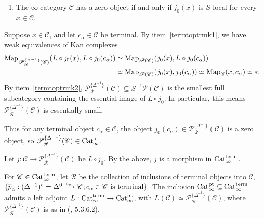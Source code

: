\documentclass{tac}
\newcommand{\s}[1]{\mathscr{#1}}
\newcommand{\maybehat}[1]{#1} %
\newcommand{\ol}[1]{\overline{#1}}
\newcommand{\tx}[1]{\textnormal{#1}}
\begin{document}
\begin{rmk}
\begin{enumerate}
\item\label{termtoptrmk3} The $\infty$-category $\s{C}$ has a zero object if and only if $j_0 (x)$ is $S$-local for every $x\in\s{C} $.
\end{enumerate}
Suppose $x\in\s{C}$, and let $c_\alpha \in \s{C}$ be terminal.  By item~\ref{termtoptrmk1}, we have weak equivalences of Kan complexes
\begin{align*} \tx{Map}_{\s{P}^{\{ \Delta^{-1} \}}_{\s{R}}(\s{C}) } (L\circ j_0 (x), L\circ j_0 (c_\alpha)) & \simeq  \tx{Map}_{\s{P}(\s{C}) } ( j_0 (x), L\circ j_0 (c_\alpha)) \\ 
& \simeq  \tx{Map}_{\s{P}(\s{C}) } ( j_0 (x),  j_0 (c_\alpha)) \simeq \tx{Map}_{\s{C}}(x,c_\alpha) \simeq *.
\end{align*}
By item~\ref{termtoptrmk2}, $\s{P}^{\{ \Delta^{-1} \}}_{\s{R}}(\s{C}) \subseteq S^{-1} \s{P}(\s{C})$ is the smallest full subcategory containing the essential image of $L\circ j_0$.  In particular, this means $\s{P}^{\{ \Delta^{-1} \}}_{\s{R}}(\s{C})$ is essentially small.

Thus for any terminal object $c_\alpha \in \s{C}$, the object $j_0 (c_\alpha) \in \s{P}^{\{ \Delta^{-1} \}}_{\s{R}}(\s{C}) $ is a zero object, so $\s{P}^{\{ \Delta^{-1} \}}_{\s{R}}(\s{C}) \in \maybehat{\tx{Cat}}_\infty^\tx{pt}$.

Let $j : \s{C} \to \s{P}^{\{ \Delta^{-1} \}}_{\s{R}}(\s{C})$ be $L\circ j_0$.  By the above, $j$ is a morphism in $\maybehat{\tx{Cat}}_\infty^\tx{term}$.
\end{rmk}
\begin{proposition}\label{termptadj} For $\s{C} \in  \maybehat{\tx{Cat}}_\infty^\tx{term}$, let $\s{R}$ be the collection of inclusions of terminal objects into $\s{C}$, $\{ \ol{p}_\alpha :  (\Delta^{-1})^{\triangleleft} = \Delta^0 \xrightarrow{c_\alpha}\s{C} ; c_\alpha \in\s{C} \tx{ is terminal} \}$. The inclusion $\maybehat{\tx{Cat}}_\infty^\tx{pt} \subseteq \maybehat{\tx{Cat}}_\infty^\tx{term}$ admits a left adjoint $L: \maybehat{\tx{Cat}}_\infty^\tx{term} \to \maybehat{\tx{Cat}}_\infty^\tx{pt}$, with $L(\s{C}) \simeq \s{P}^{\{ \Delta^{-1} \}}_{\s{R}}(\s{C}) $, where $\s{P}^{\{ \Delta^{-1} \}}_{\s{R}}(\s{C})$ is as in (\cite{htt}, 5.3.6.2).
\end{proposition}
\end{document}
